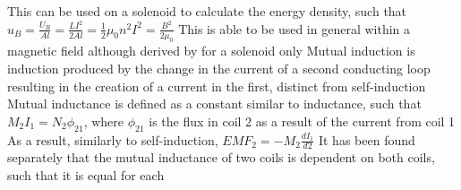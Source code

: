 \documentclass[11 pt, twoside]{article}
\newenvironment{outline*}
{
	\begin{outline}[enumerate]
	}
	{\end{outline}
}
\begin{document}
\begin{outline*}
\3 This can be used on a solenoid to calculate the energy density, such that $u_B = \frac{U_B}{Al} = \frac{LI^2}{2Al} = \frac{1}{2}\mu_0n^2I^2 = \frac{B^2}{2\mu_0}$
\4 This is able to be used in general within a magnetic field although derived by for a solenoid only
\1 Mutual induction is induction produced by the change in the current of a second conducting loop resulting in the creation of a current in the first, distinct from self-induction
\2 Mutual inductance is defined as a constant similar to inductance, such that $M_2I_1 = N_2\phi_{21}$, where $\phi_{21}$ is the flux in coil 2 as a result of the current from coil 1
\2 As a result, similarly to self-induction, $EMF_2 = -M_2\frac{dI_1}{d2}$
\2 It has been found separately that the mutual inductance of two coils is dependent on both coils, such that it is equal for each
\end{outline*}
\end{document}
